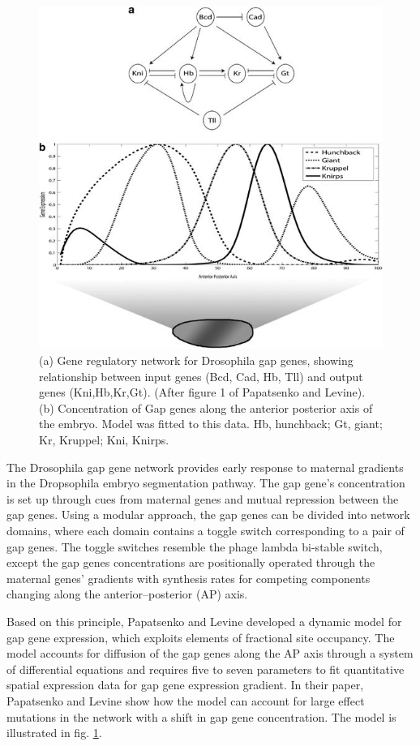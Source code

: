 \begin{figure}
    \centering
    \includegraphics[scale=0.75]{tex/review/hdy201352f1.jpg}
    \caption{(a) Gene regulatory network for Drosophila gap genes, showing relationship between input genes (Bcd, Cad, Hb, Tll) and output genes (Kni,Hb,Kr,Gt). (After figure 1 of Papatsenko and Levine\cite{papatsenko11}). (b) Concentration of Gap genes along the anterior posterior axis of the embryo. Model was fitted to this data. Hb, hunchback; Gt, giant; Kr, Kruppel; Kni, Knirps.}
    \label{fig:review1}
\end{figure}

The Drosophila gap gene network provides early response to maternal gradients in the Dropsophila embryo segmentation pathway. The gap gene’s concentration is set up through cues from maternal genes and mutual repression between the gap genes. Using a modular approach, the gap genes can be divided into network domains, where each domain contains a toggle switch corresponding to a pair of gap genes. The toggle switches resemble the phage lambda bi-stable switch, except the gap genes concentrations are positionally operated through the maternal genes’ gradients with synthesis rates for competing components changing along the anterior–posterior (AP) axis.

Based on this principle, Papatsenko and Levine \cite{papatsenko11} developed a dynamic model for gap gene expression, which exploits elements of fractional site occupancy. The model accounts for diffusion of the gap genes along the AP axis through a system of differential equations and requires five to seven parameters to fit quantitative spatial expression data for gap gene expression gradient. In their paper, Papatsenko and Levine show how the model can account for large effect mutations in the network with a shift in gap gene concentration. The model is illustrated in fig. \ref{fig:review1}.

